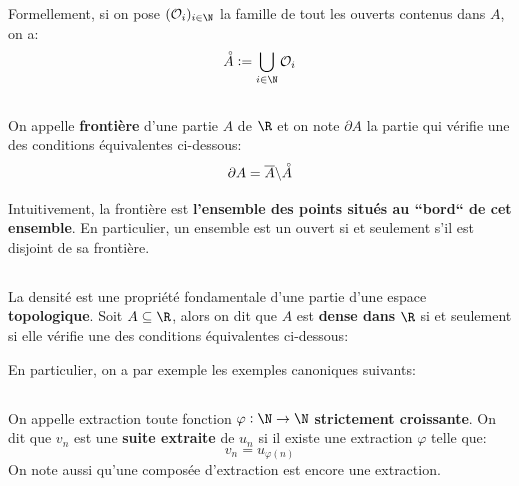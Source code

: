 Formellement, si on pose \((\mathcal{O}_i)_{i \in \N}\) la famille de tout les ouverts contenus dans \(A\), on a:
\[
    \accentset{\circ}{A} := \bigcup_{i \in \N} \mathcal{O}_i
\]

\subsection*{}
On appelle \textbf{frontière} d'une partie \(A\) de \(\R\) et on note \(\partial A\) la partie qui vérifie une des conditions équivalentes ci-dessous:
\[
        \partial A = \overline{A} \backslash \accentset{\circ}{A}
\]

Intuitivement, la frontière est \textbf{l'ensemble des points situés au ``bord`` de cet ensemble}.\+
En particulier, un ensemble est un ouvert si et seulement s'il est disjoint de sa frontière.

\subsection*{}
La densité est une propriété fondamentale d'une partie d'une espace \textbf{topologique}.
Soit \(A \subseteq \R\), alors on dit que \(A\) est \textbf{dense dans} \(\R\) si et seulement si elle vérifie une des conditions équivalentes ci-dessous:
\pagebreak

En particulier, on a par exemple les exemples canoniques suivants:

\subsection*{}
On appelle extraction toute fonction \(\varphi : \N \rightarrow \N\) \textbf{strictement croissante}.\+
On dit que \(v_n\) est une \textbf{suite extraite} de \(u_n\) si il existe une extraction \(\varphi\) telle que:
\[
    v_n = u_{\varphi(n)}
\]
On note aussi qu'une composée d'extraction est encore une extraction.

